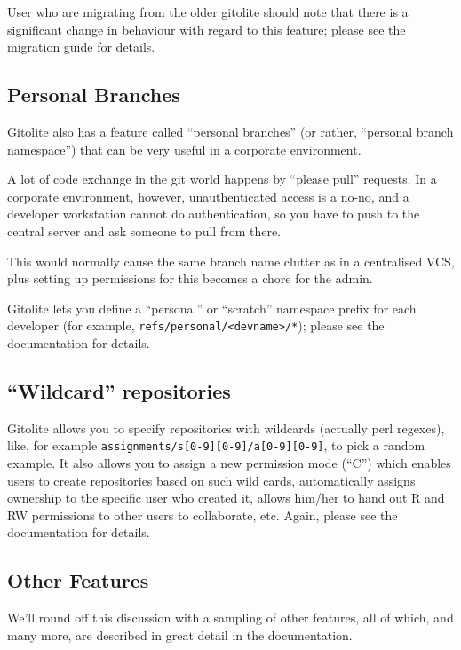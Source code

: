 \documentclass[a4paper]{book}
\begin{document}
User who are migrating from the older gitolite should note that there is a significant change in behaviour with regard to this feature; please see the migration guide for details.

\subsection{Personal Branches}

Gitolite also has a feature called “personal branches” (or rather, “personal branch namespace”) that can be very useful in a corporate environment.

A lot of code exchange in the git world happens by “please pull” requests. In a corporate environment, however, unauthenticated access is a no-no, and a developer workstation cannot do authentication, so you have to push to the central server and ask someone to pull from there.

This would normally cause the same branch name clutter as in a centralised VCS, plus setting up permissions for this becomes a chore for the admin.

Gitolite lets you define a “personal” or “scratch” namespace prefix for each developer (for example, \texttt{refs/personal/\textless{}devname\textgreater{}/*}); please see the documentation for details.

\subsection{“Wildcard” repositories}

Gitolite allows you to specify repositories with wildcards (actually perl regexes), like, for example \texttt{assignments/s{[}0-9{]}{[}0-9{]}/a{[}0-9{]}{[}0-9{]}}, to pick a random example. It also allows you to assign a new permission mode (“C”) which enables users to create repositories based on such wild cards, automatically assigns ownership to the specific user who created it, allows him/her to hand out R and RW permissions to other users to collaborate, etc. Again, please see the documentation for details.

\subsection{Other Features}

We'll round off this discussion with a sampling of other features, all of which, and many more, are described in great detail in the documentation.
\end{document}

